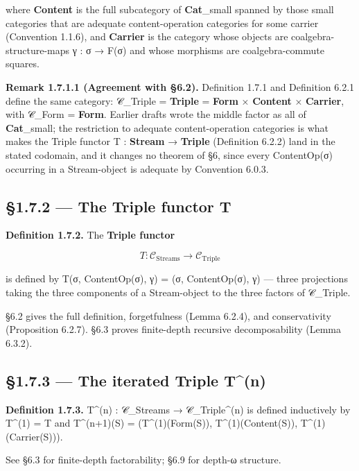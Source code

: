 \documentclass[11pt, openany]{book}
\begin{document}
where \textbf{Content} is the full subcategory of \textbf{Cat}\_\allowbreak{}small spanned by those small categories that are adequate content-operation categories for some carrier (Convention 1.1.6), and \textbf{Carrier} is the category whose objects are coalgebra-structure-maps γ : σ → F(σ) and whose morphisms are coalgebra-commute squares.

\textbf{Remark 1.7.1.1 (Agreement with §6.2).} Definition 1.7.1 and Definition 6.2.1 define the same category: 𝒞\_\allowbreak{}Triple = \textbf{Triple} = \textbf{Form} × \textbf{Content} × \textbf{Carrier}, with 𝒞\_\allowbreak{}Form = \textbf{Form}. Earlier drafts wrote the middle factor as all of \textbf{Cat}\_\allowbreak{}small; the restriction to adequate content-operation categories is what makes the Triple functor T : \textbf{Stream} → \textbf{Triple} (Definition 6.2.2) land in the stated codomain, and it changes no theorem of §6, since every ContentOp(σ) occurring in a Stream-object is adequate by Convention 6.0.3.

\subsection{§1.7.2 --- The Triple functor T}

\textbf{Definition 1.7.2.} The \textbf{Triple functor}

\[
T : \mathcal{C}_\mathrm{Streams} \to \mathcal{C}_\mathrm{Triple}
\]

is defined by T(σ, ContentOp(σ), γ) = (σ, ContentOp(σ), γ) --- three projections taking the three components of a Stream-object to the three factors of 𝒞\_\allowbreak{}Triple.

§6.2 gives the full definition, forgetfulness (Lemma 6.2.4), and conservativity (Proposition 6.2.7). §6.3 proves finite-depth recursive decomposability (Lemma 6.3.2).

\subsection{§1.7.3 --- The iterated Triple T\textasciicircum{}(n)}

\textbf{Definition 1.7.3.} T\textasciicircum{}(n) : 𝒞\_\allowbreak{}Streams → 𝒞\_\allowbreak{}Triple\textasciicircum{}(n) is defined inductively by T\textasciicircum{}(1) = T and T\textasciicircum{}(n+1)(S) = (T\textasciicircum{}(1)(Form(S)), T\textasciicircum{}(1)(Content(S)), T\textasciicircum{}(1)(Carrier(S))).

See §6.3 for finite-depth factorability; §6.9 for depth-ω structure.
\end{document}
